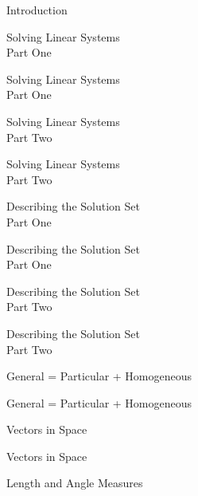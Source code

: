 \documentclass{titlescreen}
\begin{document}
\begin{videotitle}
  Introduction
\end{videotitle}

\begin{videoend}
  Solving Linear Systems \\[1ex]
  Part One
\end{videoend}

\begin{videotitle}
  Solving Linear Systems \\[1ex]
  Part One
\end{videotitle}

\begin{videoend}
  Solving Linear Systems \\[1ex]
  Part Two
\end{videoend}

\begin{videotitle}
  Solving Linear Systems \\[1ex]
  Part Two
\end{videotitle}
\begin{videoend}
  Describing the Solution Set \\[1ex]
  Part One
\end{videoend}


\begin{videotitle}
  Describing the Solution Set \\[1ex]
  Part One
\end{videotitle}
\begin{videoend}
  Describing the Solution Set \\[1ex]
  Part Two
\end{videoend}

\begin{videotitle}
  Describing the Solution Set \\[1ex]
  Part Two
\end{videotitle}
\begin{videoend}
  General = Particular + Homogeneous
\end{videoend}


\begin{videotitle}
  General = Particular + Homogeneous
\end{videotitle}
\begin{videoend}
  Vectors in Space
\end{videoend}


\begin{videotitle}
  Vectors in Space
\end{videotitle}
\begin{videoend}
  Length and Angle Measures 
\end{videoend}
\end{document}

